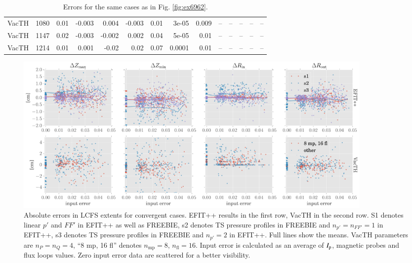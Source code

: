 \begin{table}
\begin{tabular}{lrrrrrrrrrrrrr}
  VacTH &   1080 &            0.01 &           -0.003 &        0.004 &       -0.003 &                   0.01 &       3e-05 &       0.009 &           -- &            -- &               -- &            -- &             -- \\
  VacTH &   1147 &            0.02 &           -0.003 &       -0.002 &        0.002 &                   0.04 &       5e-05 &        0.01 &           -- &            -- &               -- &            -- &             -- \\
  VacTH &   1214 &            0.01 &            0.001 &        -0.02 &         0.02 &                   0.07 &      0.0001 &        0.01 &           -- &            -- &               -- &            -- &             -- \\
\bottomrule
\end{tabular}
\caption{Errors for the same cases as in Fig. \ref{fig:ex6962}.}
\label{table:ex6962}
\end{table}


\begin{figure}
\centering   %
\hfill{}
\includegraphics[width=18cm]{figures/RZstats.pdf}
\hfill{}
\caption{Absolute errors in LCFS extents for convergent cases. EFIT++ results in the first row, VacTH in the second row. S1 denotes linear $p'$ and $FF'$ in EFIT++ as well as FREEBIE, s2 denotes TS pressure profiles in FREEBIE and $n_{p'} = n_{FF'} = 1$ in EFIT++, s3 denotes TS pressure profiles in FREEBIE and $n_{p'} = 2$ in EFIT++. Full lines show the means. VacTH parameters are $n_P=n_Q=4$, ``8 mp, 16 fl'' denotes $n_\mathrm{mp}=8$, $n_\mathrm{fl}=16$. Input error is calculated as an average of $I_{\rm{p}}$, magnetic probes and flux loops values. Zero input error data are scattered for a better visibility.}
\label{fig:RZstats}
\end{figure}

